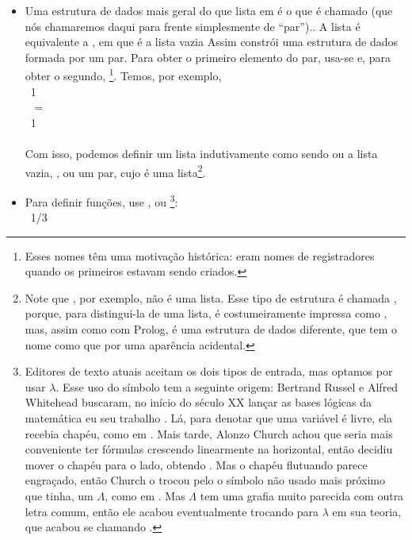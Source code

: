 \documentclass{article}
\begin{document}
\begin{itemize}
\item Uma estrutura de dados mais geral do que lista em
   é o que é chamado  (que nós
  chamaremos daqui para frente simplesmente de ``par'').. A lista
   é equivalente a , em que  é a lista
  vazia
    Assim  constrói uma estrutura de
    dados formada por um par. Para obter o primeiro elemento do par,
    usa-se  e, para obter o segundo,
    \footnote{Esses nomes têm uma motivação histórica:
      eram nomes de registradores quando os primeiros
       estavam sendo criados.}. Temos, por exemplo,\\
     \seta\ 1\\
     \seta\  =
    \\
     \seta\ 1\\
     \seta\ \\
    Com isso, podemos definir um lista indutivamente como sendo ou a
    lista vazia, , ou um par, cujo
     é uma lista\footnote{Note que ,
      por exemplo, não é uma lista. Esse tipo de estrutura é chamada
      , porque, para distingui-la de uma lista, é
      costumeiramente impressa como , mas, assim como
      com Prolog, é uma estrutura de dados diferente, que tem o nome
       como que por uma aparência acidental.}.
\item Para definir funções, use , ou
  \enphasisb{$\lambda$}\footnote{Editores de texto atuais aceitam os dois tipos de
    entrada, mas optamos por usar $\lambda$. Esse uso do símbolo tem a
    seguinte origem: Bertrand Russel e Alfred Whitehead buscaram, no
    início do século XX lançar as bases lógicas da matemática eu seu
    trabalho . Lá, para denotar que uma
    variável é livre, ela recebia chapéu, como em . Mais tarde, Alonzo Church achou que seria mais conveniente
    ter fórmulas crescendo linearmente na horizontal, então decidiu
    mover o chapéu para o lado, obtendo .
    Mas o chapéu flutuando parece engraçado, então Church o trocou
    pelo  o símbolo não usado mais próximo que tinha, um $\Lambda$, como em
    . Mas
    $\Lambda$ tem uma grafia muito parecida com outra letra comum, então
    ele acabou eventualmente trocando para $\lambda$ em sua teoria, que
    acabou se chamando  \cite{norvig}.}:\\
   \seta\ 1/3


\end{itemize}
\end{document}
